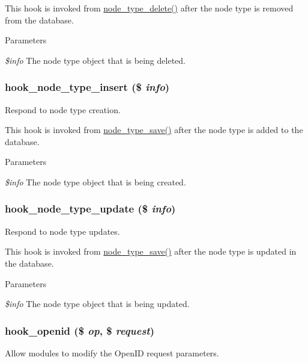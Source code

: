 This hook is invoked from \hyperlink{node_8module_a7fe2d244b6635513800a027053144425}{node\_\-type\_\-delete()} after the node type is removed from the database.


\begin{DoxyParams}{Parameters}
\item[{\em \$info}]The node type object that is being deleted. \end{DoxyParams}
\hypertarget{group__hooks_ga8941b418846350a7edbd67ac388a5dfb}{
\subsubsection[{hook\_\-node\_\-type\_\-insert}]{\setlength{\rightskip}{0pt plus 5cm}hook\_\-node\_\-type\_\-insert (\$ {\em info})}}
\label{group__hooks_ga8941b418846350a7edbd67ac388a5dfb}
Respond to node type creation.

This hook is invoked from \hyperlink{node_8module_a9a5c06f9903cea586bd44a7d6e9e086c}{node\_\-type\_\-save()} after the node type is added to the database.


\begin{DoxyParams}{Parameters}
\item[{\em \$info}]The node type object that is being created. \end{DoxyParams}
\hypertarget{group__hooks_ga7518f336bfbd131259f520fcd45ba710}{
\subsubsection[{hook\_\-node\_\-type\_\-update}]{\setlength{\rightskip}{0pt plus 5cm}hook\_\-node\_\-type\_\-update (\$ {\em info})}}
\label{group__hooks_ga7518f336bfbd131259f520fcd45ba710}
Respond to node type updates.

This hook is invoked from \hyperlink{node_8module_a9a5c06f9903cea586bd44a7d6e9e086c}{node\_\-type\_\-save()} after the node type is updated in the database.


\begin{DoxyParams}{Parameters}
\item[{\em \$info}]The node type object that is being updated. \end{DoxyParams}
\hypertarget{group__hooks_ga965f1ea7c6181118bd6d417c0f6db530}{
\subsubsection[{hook\_\-openid}]{\setlength{\rightskip}{0pt plus 5cm}hook\_\-openid (\$ {\em op}, \/  \$ {\em request})}}
\label{group__hooks_ga965f1ea7c6181118bd6d417c0f6db530}
Allow modules to modify the OpenID request parameters.


